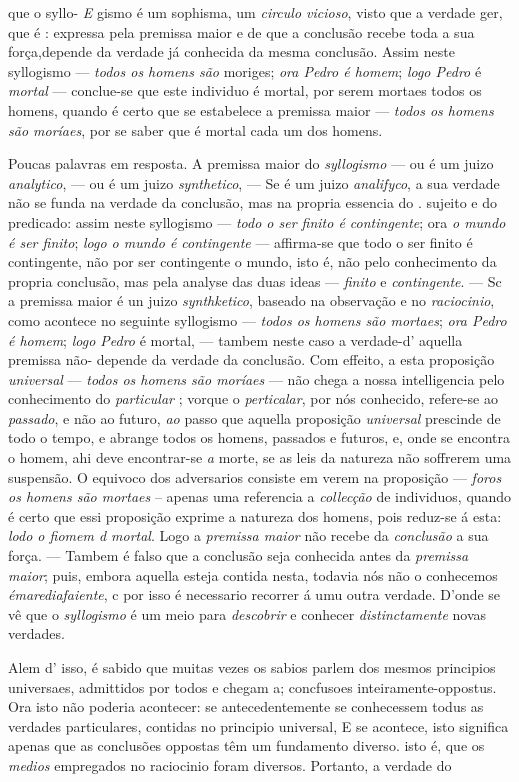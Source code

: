 que o syllo- \emph{E} gismo é um sophisma, um \emph{circulo vicioso}, visto que a verdade ger, que é : expressa pela premissa maior e de que a conclusão recebe toda a sua força,depende da verdade já conhecida da mesma conclusão. Assim neste syllogismo --- \emph{todos os homens são} moriges; \emph{ora Pedro é homem}; \emph{logo Pedro} é \emph{mortal} --- conclue-se que este individuo é mortal, por serem mortaes todos os homens, quando é certo que se estabelece a premissa maior --- \emph{todos os homens são moríaes}, por se saber que é mortal cada um dos homens.\par Poucas palavras em resposta. A premissa maior do \emph{syllogismo} --- ou é um juizo \emph{analytico}, --- ou é um juizo \emph{synthetico}, --- Se é um juizo \emph{analifyco}, a sua verdade não se funda na verdade da conclusão, mas na propria essencia do . sujeito e do predicado: assim neste syllogismo --- \emph{todo o ser finito é contingente}; ora \emph{o mundo é ser finito}; \emph{logo o mundo é contingente} --- affirma-se que todo o ser finito é contingente, não por ser contingente o mundo, isto é, não pelo conhecimento da propria conclusão, mas pela analyse das duas ideas --- \emph{finito} e \emph{contingente}. --- Sc a premissa maior é un juizo \emph{synthketico}, baseado na observação e no \emph{raciocinio}, como acontece no seguinte syllogismo --- \emph{todos os homens são mortaes}; \emph{ora Pedro é homem}; \emph{logo Pedro} é mortal, --- tambem neste caso a verdade-d' aquella premissa não- depende da verdade da conclusão. Com effeito, a esta proposição \emph{universal} --- \emph{todos os homens são moríaes} --- não chega a nossa intelligencia pelo conhecimento do \emph{particular} ; vorque o \emph{perticalar}, por nós conhecido, refere-se ao \emph{passado}, e não ao futuro, \emph{ao} passo que aquella proposição \emph{universal} prescinde de todo o tempo, e abrange todos os homens, passados e futuros, e, onde se encontra o homem, ahi deve encontrar-se \emph{a} morte, se as leis da natureza não soffrerem uma suspensão. O equivoco dos adversarios consiste em verem na proposição --- \emph{foros os homens são mortaes} -- apenas uma referencia a \emph{collecção} de individuos, quando é certo que essi proposição exprime a natureza dos homens, pois reduz-se á esta: \emph{lodo o fiomem d mortal}. Logo a \emph{premissa maior} não recebe da \emph{conclusão} a sua força. --- Tambem é falso que a conclusão seja conhecida antes da \emph{premissa maior}; puis, embora aquella esteja contida nesta, todavia nós não o conhecemos \emph{émarediafaiente}, c por isso é necessario recorrer á umu outra verdade. D'onde se vê que o \emph{syllogismo} é um meio para \emph{descobrir} e conhecer \emph{distinctamente} novas verdades.\par Alem d' isso, é sabido que muitas vezes os sabios parlem dos mesmos principios universaes, admittidos por todos e chegam a; concfusoes inteiramente-oppostus. Ora isto não poderia acontecer: se antecedentemente se conhecessem todus as verdades particulares, contidas no principio universal, E se acontece, isto significa apenas que as conclusões oppostas têm um fundamento diverso. isto é, que os \emph{medios} empregados no raciocinio foram diversos. Portanto, a verdade do 